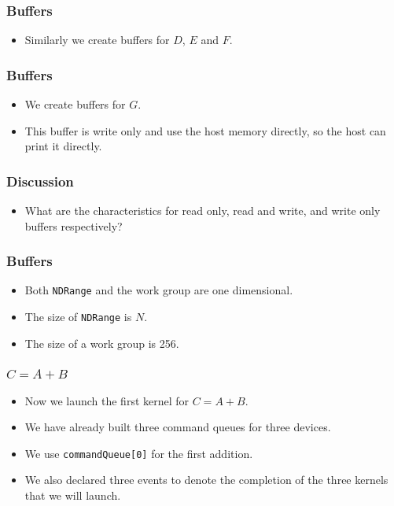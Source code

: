 \documentclass{beamer}
\begin{document}
\begin{frame}
  \frametitle{Buffers}
  \begin{itemize}
    \item Similarly we create buffers for $D$, $E$ and $F$.
  \end{itemize}
\end{frame}

\begin{frame}
\end{frame}

\begin{frame}
  \frametitle{Buffers}
  \begin{itemize}
    \item We create buffers for $G$.
    \item This buffer is write only and use the host memory directly,
      so the host can print it directly.
  \end{itemize}
\end{frame}

\begin{frame}
\end{frame}

\begin{frame}
  \frametitle{Discussion}
  \begin{itemize}
    \item What are the characteristics for read only, read and write,
      and write only buffers respectively?
  \end{itemize}
\end{frame}

\begin{frame}
  \frametitle{Buffers}
  \begin{itemize}
    \item Both {\tt NDRange} and the work group are one dimensional.
    \item The size of {\tt NDRange} is $N$.
    \item The size of a work group is 256.
  \end{itemize}
\end{frame}

\begin{frame}
\end{frame}

\begin{frame}
  \frametitle{$C = A + B$}
  \begin{itemize}
    \item Now we launch the first kernel for $C = A + B$.
    \item We have already built three command queues for three devices.  
    \item We use {\tt commandQueue[0]} for the first addition.
    \item We also declared three events to denote the completion of
      the three kernels that we will launch.
  \end{itemize}
\end{frame}
\end{document}
